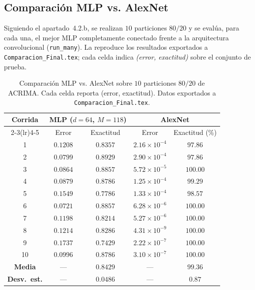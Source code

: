 \documentclass[11pt,a4paper]{article}
\begin{document}
\subsection{Comparación MLP vs. AlexNet}

Siguiendo el apartado~4.2.b, se realizan $10$ particiones $80/20$ y se evalúa,
para cada una, el mejor MLP completamente conectado frente a la arquitectura
convolucional (\texttt{run\_many}). La  reproduce los
resultados exportados a \texttt{Comparacion\_Final.tex}; cada celda indica
\emph{(error, exactitud)} sobre el conjunto de prueba.

\begin{table}[H]
\centering
\caption{Comparación MLP vs. AlexNet sobre $10$ particiones $80/20$ de ACRIMA.
Cada celda reporta (error, exactitud). Datos exportados a
\texttt{Comparacion\_Final.tex}.}
\label{tab:comp-final}
\begin{tabular}{@{}ccccc@{}}
\toprule
\multirow{2}{*}{Corrida} &
\multicolumn{2}{c}{MLP ($d{=}64$, $M{=}118$)} &
\multicolumn{2}{c}{AlexNet}\\
\cmidrule(lr){2-3}\cmidrule(lr){4-5}
 & Error & Exactitud & Error & Exactitud (\%)\\
\midrule
1  & $0.1208$ & $0.8357$ & $2.16\!\times\!10^{-4}$ & $97.86$\\
2  & $0.0799$ & $0.8929$ & $2.90\!\times\!10^{-4}$ & $97.86$\\
3  & $0.0864$ & $0.8857$ & $5.72\!\times\!10^{-5}$ & $100.00$\\
4  & $0.0879$ & $0.8786$ & $1.25\!\times\!10^{-4}$ & $99.29$\\
5  & $0.1549$ & $0.7786$ & $1.33\!\times\!10^{-4}$ & $98.57$\\
6  & $0.0721$ & $0.8857$ & $6.28\!\times\!10^{-6}$ & $100.00$\\
7  & $0.1198$ & $0.8214$ & $5.27\!\times\!10^{-6}$ & $100.00$\\
8  & $0.1214$ & $0.8286$ & $4.31\!\times\!10^{-9}$ & $100.00$\\
9  & $0.1737$ & $0.7429$ & $2.22\!\times\!10^{-7}$ & $100.00$\\
10 & $0.0996$ & $0.8786$ & $3.10\!\times\!10^{-7}$ & $100.00$\\
\midrule
\textbf{Media} & --- & $\mathbf{0.8429}$ & --- & $\mathbf{99.36}$\\
\textbf{Desv.\ est.} & --- & $0.0486$ & --- & $0.87$\\
\bottomrule
\end{tabular}
\end{table}
\end{document}
